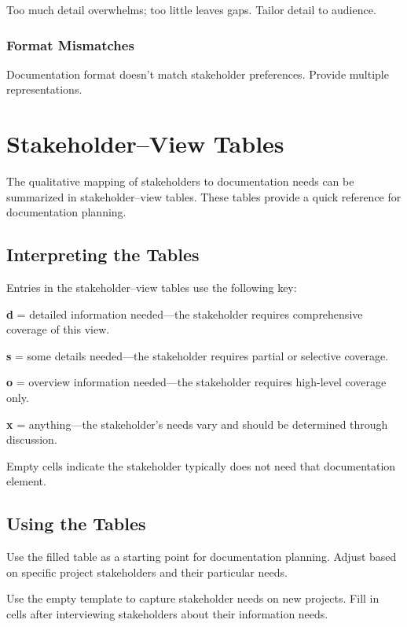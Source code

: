 \documentclass[11pt]{article}
\begin{document}
Too much detail overwhelms; too little leaves gaps. Tailor detail to audience.

\subsubsection{Format Mismatches}

Documentation format doesn't match stakeholder preferences. Provide multiple representations.

\section{Stakeholder--View Tables}

The qualitative mapping of stakeholders to documentation needs can be summarized in stakeholder--view tables. These tables provide a quick reference for documentation planning.

\subsection{Interpreting the Tables}

Entries in the stakeholder--view tables use the following key:

\textbf{d} = detailed information needed---the stakeholder requires comprehensive coverage of this view.

\textbf{s} = some details needed---the stakeholder requires partial or selective coverage.

\textbf{o} = overview information needed---the stakeholder requires high-level coverage only.

\textbf{x} = anything---the stakeholder's needs vary and should be determined through discussion.

Empty cells indicate the stakeholder typically does not need that documentation element.

\subsection{Using the Tables}

Use the filled table as a starting point for documentation planning. Adjust based on specific project stakeholders and their particular needs.

Use the empty template to capture stakeholder needs on new projects. Fill in cells after interviewing stakeholders about their information needs.
\end{document}
